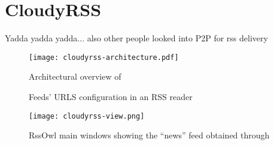 \chapter{CloudyRSS}
Yadda yadda yadda... also other people looked into P2P for rss
delivery \cite{P2PFeedDelivery}
\cite{AttackResilientP2PFeedDissemination} \cite{SimpleSecurityP2PFeedDissemination}

\begin{figure}[H]
  \texttt{[image: cloudyrss-architecture.pdf]}
  \caption{Architectural overview of \cloudyrss}
  \label{fig:cloudyrss-architecture}
\end{figure}

\begin{figure}[H]
  \centering
  \caption{Feeds' URLS configuration in an RSS reader}
  \label{fig:cloudyrss-feeds}
\end{figure}

\begin{figure}[H]
  \hspace{-40pt}
  \texttt{[image: cloudyrss-view.png]}
  \caption{RssOwl main windows showing the ``news'' feed obtained
    through \cloudyrss}
  \label{fig:cloudyrss-view}
\end{figure}
